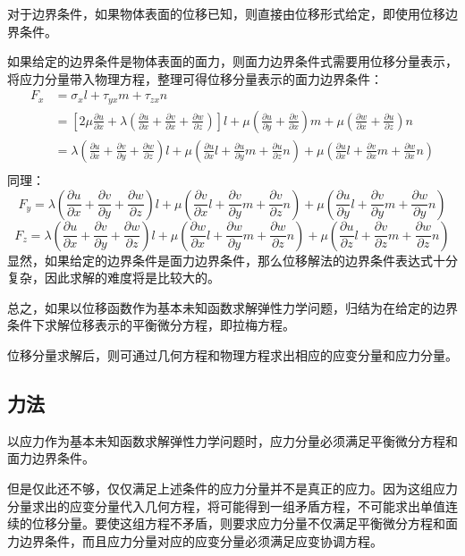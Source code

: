 \documentclass[12pt,a4paper]{article}
\begin{document}
对于边界条件，如果物体表面的位移已知，则直接由位移形式给定，即使用位移边界条件。

如果给定的边界条件是物体表面的面力，则面力边界条件式需要用位移分量表示，将应力分量带入物理方程，整理可得位移分量表示的面力边界条件：
\begin{align*}
F_x & = \sigma_x l+\tau_{yx}m+\tau_{zx}n \\
& =  \left[2\mu\frac{\partial u}{\partial x}+\lambda(\frac{\partial u}{\partial x}+\frac{\partial v}{\partial x}+\frac{\partial w}{\partial z})\right]l+\mu(\frac{\partial u}{\partial y}+\frac{\partial v}{\partial x})m +\mu(\frac{\partial w}{\partial x}+\frac{\partial u}{\partial z})n \\
& = \lambda(\frac{\partial u}{\partial x}+\frac{\partial v}{\partial y}+\frac{\partial w}{\partial z})l+\mu(\frac{\partial u}{\partial x}l+\frac{\partial u}{\partial y}m+\frac{\partial u}{\partial z}n)+\mu(\frac{\partial u}{\partial x}l+\frac{\partial v}{\partial x}m+\frac{\partial w}{\partial x}n) \\
\end{align*}
同理：
$$
F_y = \lambda(\frac{\partial u}{\partial x}+\frac{\partial v}{\partial y}+\frac{\partial w}{\partial z})l+\mu(\frac{\partial v}{\partial x}l+\frac{\partial v}{\partial y}m+\frac{\partial v}{\partial z}n)+\mu(\frac{\partial u}{\partial y}l+\frac{\partial v}{\partial y}m+\frac{\partial w}{\partial y}n)
$$
$$
F_z = \lambda(\frac{\partial u}{\partial x}+\frac{\partial v}{\partial y}+\frac{\partial w}{\partial z})l+\mu(\frac{\partial w}{\partial x}l+\frac{\partial w}{\partial y}m+\frac{\partial w}{\partial z}n)+\mu(\frac{\partial u}{\partial z}l+\frac{\partial v}{\partial z}m+\frac{\partial w}{\partial z}n)
$$
显然，如果给定的边界条件是面力边界条件，那么位移解法的边界条件表达式十分复杂，因此求解的难度将是比较大的。

总之，如果以位移函数作为基本未知函数求解弹性力学问题，归结为在给定的边界条件下求解位移表示的平衡微分方程，即拉梅方程。

位移分量求解后，则可通过几何方程和物理方程求出相应的应变分量和应力分量。

\subsection{力法}

以应力作为基本未知函数求解弹性力学问题时，应力分量必须满足平衡微分方程和面力边界条件。

但是仅此还不够，仅仅满足上述条件的应力分量并不是真正的应力。因为这组应力分量求出的应变分量代入几何方程，将可能得到一组矛盾方程，不可能求出单值连续的位移分量。要使这组方程不矛盾，则要求应力分量不仅满足平衡微分方程和面力边界条件，而且应力分量对应的应变分量必须满足应变协调方程。
\end{document}
